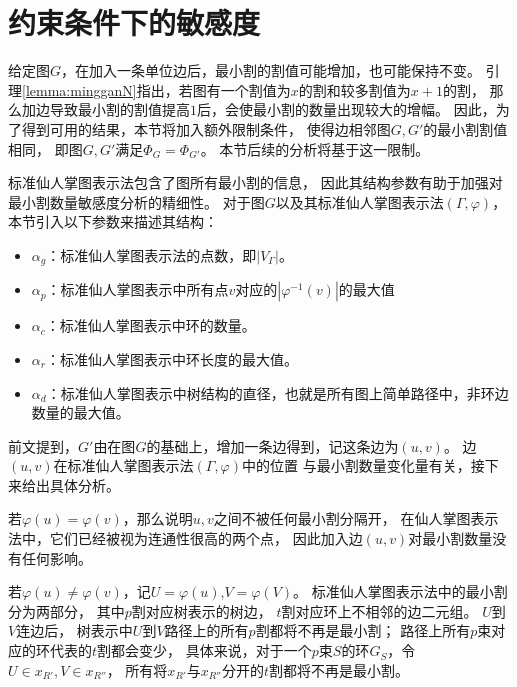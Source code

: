 \section{约束条件下的敏感度}
给定图$G$，在加入一条单位边后，最小割的割值可能增加，也可能保持不变。
引理\ref{lemma:mingganN}指出，若图有一个割值为$x$的割和较多割值为$x+1$的割，
那么加边导致最小割的割值提高$1$后，会使最小割的数量出现较大的增幅。
因此，为了得到可用的结果，本节将加入额外限制条件，
使得边相邻图$G,G'$的最小割割值相同，
即图$G,G'$满足$\Phi_G=\Phi_{G'}$。
本节后续的分析将基于这一限制。

标准仙人掌图表示法包含了图所有最小割的信息，
因此其结构参数有助于加强对最小割数量敏感度分析的精细性。
对于图$G$以及其标准仙人掌图表示法$(\Gamma,\varphi)$，
本节引入以下参数来描述其结构：
\begin{itemize}
  \item $\alpha_{g}$：标准仙人掌图表示法的点数，即$|V_{\Gamma}|$。
  \item $\alpha_{p}$：标准仙人掌图表示中所有点$v$对应的$|\varphi^{-1}(v)|$的最大值%
  \item $\alpha_{c}$：标准仙人掌图表示中环的数量。
  \item $\alpha_{r}$：标准仙人掌图表示中环长度的最大值。
  \item $\alpha_{d}$：标准仙人掌图表示中树结构的直径，也就是所有图上简单路径中，非环边数量的最大值。
\end{itemize}


前文提到，$G'$由在图$G$的基础上，增加一条边得到，记这条边为$(u,v)$。
边$(u,v)$在标准仙人掌图表示法$(\Gamma,\varphi)$中的位置
与最小割数量变化量有关，接下来给出具体分析。

若$\varphi(u)=\varphi(v)$，那么说明$u,v$之间不被任何最小割分隔开，
在仙人掌图表示法中，它们已经被视为连通性很高的两个点，
因此加入边$(u,v)$对最小割数量没有任何影响。

若$\varphi(u)\neq\varphi(v)$，记$U=\varphi(u)$,$V=\varphi(V)$。
标准仙人掌图表示法中的最小割分为两部分，
其中$p$割对应树表示的树边，
$t$割对应环上不相邻的边二元组。
$U$到$V$连边后，
树表示中$U$到$V$路径上的所有$p$割都将不再是最小割；
路径上所有$p$束对应的环代表的$t$割都会变少，
具体来说，对于一个$p$束$S$的环$G_S$，令$U\in x_{R'},V\in x_{R''}$，
所有将$x_{R'}$与$x_{R''}$分开的$t$割都将不再是最小割。

